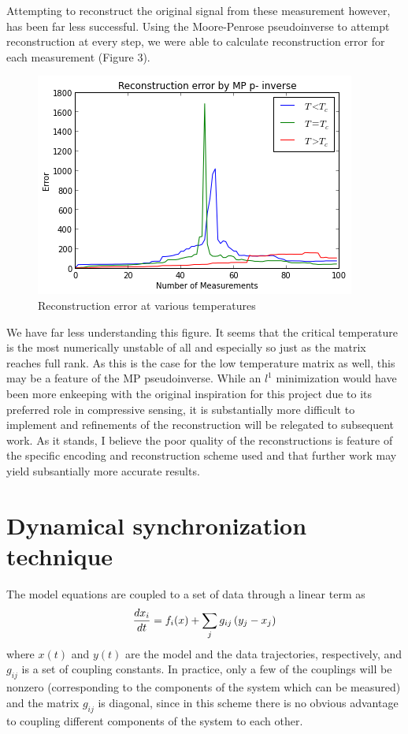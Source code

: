 \documentclass{article} %
\begin{document}
Attempting to reconstruct the original signal from these measurement however, has
been far less successful.  Using the Moore-Penrose pseudoinverse to attempt
reconstruction at every step, we were able to calculate reconstruction error
for each measurement (Figure 3).  
\begin{figure}[h]
\begin{center}
\includegraphics[width=0.5\linewidth]{errors.png}
\end{center}
\caption{Reconstruction error at various temperatures}
\end{figure}
We have far less understanding this figure.  It seems that the critical temperature
is the most numerically unstable of all and especially so just as the matrix reaches
full rank.  As this is the case for the low temperature matrix as well, this may be
a feature of the MP pseudoinverse.  While an $l^1$ minimization would have been more
enkeeping with the original inspiration for this project due to its preferred role
in compressive sensing, it is substantially more difficult to implement and refinements
of the reconstruction will be relegated to subsequent work. As it stands, I believe
the poor quality of the reconstructions is feature of the specific encoding and 
reconstruction scheme used and that further work may yield subsantially more accurate results.
\section{Dynamical synchronization technique}
The model equations are coupled to a set of data through a linear term as
\begin{align}
	\frac{d x_i}{d t} = f_i(x) + \sum_{j} g_{ij} \left(y_j - x_j\right)
\end{align}
where $x(t)$ and $y(t)$ are the model and the data trajectories, respectively, and $g_{ij}$ is a set of coupling constants.  In practice, only a few of the couplings will be nonzero (corresponding to the components of the system which can be measured) and the matrix $g_{ij}$ is diagonal, since in this scheme there is no obvious advantage to coupling different components of the system to each other.
\end{document}
